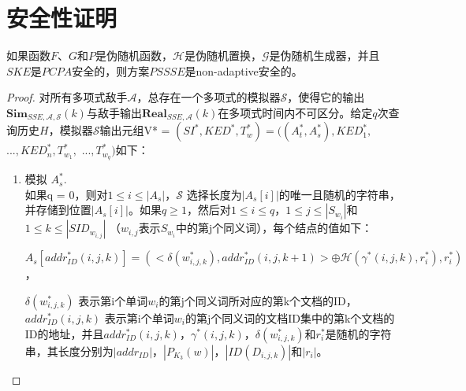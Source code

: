 \section{安全性证明}
\label{sec:synonym_security_analysis}

\begin{thm}
\label{thm:security_proof}

如果函数$F$、$G$和$P$是伪随机函数，$\mathcal{H}$是伪随机置换，$\mathcal{G}$是伪随机生成器，并且$SKE$是$PCPA$安全的，则方案$PSSSE$是non-adaptive安全的。

\begin{proof}
对所有多项式敌手$\mathcal{A}$，总存在一个多项式的模拟器$\mathcal{S}$，使得它的输出$\textbf{Sim}_{SSE,\mathcal{A},\mathcal{S}}(k)$与敌手输出$\textbf{Real}_{SSE,\mathcal{A}}(k)$在多项式时间内不可区分。给定$q$次查询历史$H$，模拟器$\mathcal{S}$输出元组V* = $(SI^*, KED^*, T_w^*) = ((A_t^*, A_s^*),KED_1^*, $ $..., KED_n^*, T_{w_1}^*,$ $..., T_{w_q}^*) $如下：

\begin{enumerate}
  \item 模拟 $A_s^*$. \\
  如果q = 0，则对$1 \leq i \leq |A_s|$，$\mathcal{S}$ 选择长度为$|A_s[i]|$的唯一且随机的字符串，并存储到位置$|A_s[i]|$。如果$q \geq 1$，然后对$1 \leq i \leq q$，$1 \leq j \leq |S_{w_i}|$和$1 \leq k \leq |SID_{w_{i,j}}|$ （$w_{i,j}$表示$S_{w_i}$中的第j个同义词），每个结点的值如下：
  \begin{center}
  $A_s[addr_{ID}^*(i, j, k)] = (<\delta(w_{i,j,k}^*), addr_{ID}^*(i, j, k+1)> \oplus \mathcal{H}(\gamma^*(i,j,k), r_i^*), r_i^*)$，
  \end{center}
  $\delta(w_{i,j,k}^*)$ 表示第i个单词$w_i$的第j个同义词所对应的第k个文档的ID，$addr_{ID}^*(i, j, k)$ 表示第i个单词$w_i$的第j个同义词的文档ID集中的第k个文档的ID的地址，并且$addr_{ID}^*(i, j, k)$，$\gamma^*(i,j,k)$，$\delta(w_{i,j,k}^*)$和$r_i^*$是随机的字符串，其长度分别为$|addr_{ID}|$，$|P_{K_3}(w)|$，$|ID(D_{i,j,k})|$和$|r_i|$。


\end{enumerate}
\end{proof}
\end{thm}
